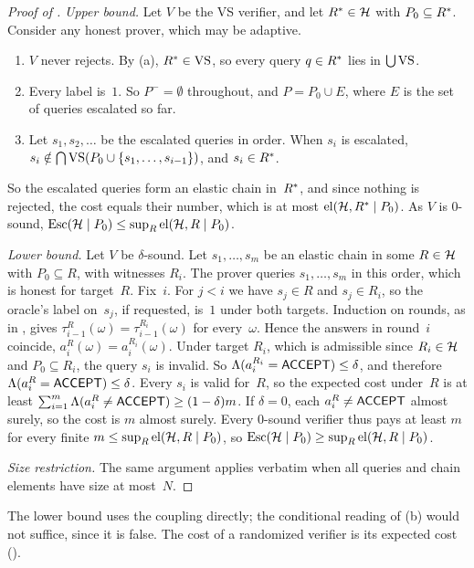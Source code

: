 \begin{proof}[Proof of ]
\emph{Upper bound.} Let $V$ be the VS verifier, and let $R^{*}\in\mathcal{H}$ with $P_0\subseteq R^{*}$. Consider any honest prover, which may be adaptive.
\begin{enumerate}[label=(\arabic*)]
\item $V$ never rejects. By (a), $R^{*}\in\mathrm{VS}$, so every query $q\in R^{*}$ lies in $\bigcup\mathrm{VS}$.
\item Every label is~$1$. So $P^-=\emptyset$ throughout, and $P=P_0\cup E$, where $E$ is the set of queries escalated so far.
\item Let $s_1,s_2,\dots$ be the escalated queries in order. When $s_i$ is escalated, $s_i\notin\bigcap\mathrm{VS}(P_0\cup\{s_1,\dots,s_{i-1}\})$, and $s_i\in R^{*}$.
\end{enumerate}
So the escalated queries form an elastic chain in~$R^{*}$, and since nothing is rejected, the cost equals their number, which is at most $\mathrm{el}(\mathcal{H},R^{*}\mid P_0)$. As $V$ is $0$-sound, $\mathrm{Esc}(\mathcal{H}\mid P_0)\le\sup_R\mathrm{el}(\mathcal{H},R\mid P_0)$.

\emph{Lower bound.} Let $V$ be $\delta$-sound. Let $s_1,\dots,s_m$ be an elastic chain in some $R\in\mathcal{H}$ with $P_0\subseteq R$, with witnesses $R_i$. The prover queries $s_1,\dots,s_m$ in this order, which is honest for target~$R$. Fix~$i$. For $j<i$ we have $s_j\in R$ and $s_j\in R_i$, so the oracle's label on~$s_j$, if requested, is~$1$ under both targets. Induction on rounds, as in , gives $\tau^R_{i-1}(\omega)=\tau^{R_i}_{i-1}(\omega)$ for every~$\omega$. Hence the answers in round~$i$ coincide, $a_i^R(\omega)=a_i^{R_i}(\omega)$. Under target $R_i$, which is admissible since $R_i\in\mathcal{H}$ and $P_0\subseteq R_i$, the query $s_i$ is invalid. So $\Lambda(a_i^{R_i}=\textsf{ACCEPT})\le\delta$, and therefore $\Lambda(a_i^R=\textsf{ACCEPT})\le\delta$. Every $s_i$ is valid for~$R$, so the expected cost under~$R$ is at least $\sum_{i=1}^m\Lambda(a^R_i\neq\textsf{ACCEPT})\ge(1-\delta)m$. If $\delta=0$, each $a_i^R\neq\textsf{ACCEPT}$ almost surely, so the cost is $m$ almost surely. Every $0$-sound verifier thus pays at least $m$ for every finite $m\le\sup_R\mathrm{el}(\mathcal{H},R\mid P_0)$, so $\mathrm{Esc}(\mathcal{H}\mid P_0)\ge\sup_R\mathrm{el}(\mathcal{H},R\mid P_0)$.

\emph{Size restriction.} The same argument applies verbatim when all queries and chain elements have size at most~$N$.
\end{proof}

The lower bound uses the coupling directly; the conditional reading of (b) would not suffice, since it is false. The cost of a randomized verifier is its expected cost ().

